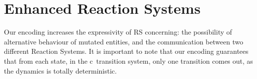 
\section{Enhanced  Reaction Systems}
\label{sec:discussion}

Our encoding increases the expressivity of  RS  concerning:
the possibility of alternative behaviour of
mutated entities, and  the communication between two different Reaction Systems.
It is important to note that our encoding guarantees that from each state, 
in the  c\CNA \ transition system, only one transition comes out, 
as the dynamics is totally deterministic.


